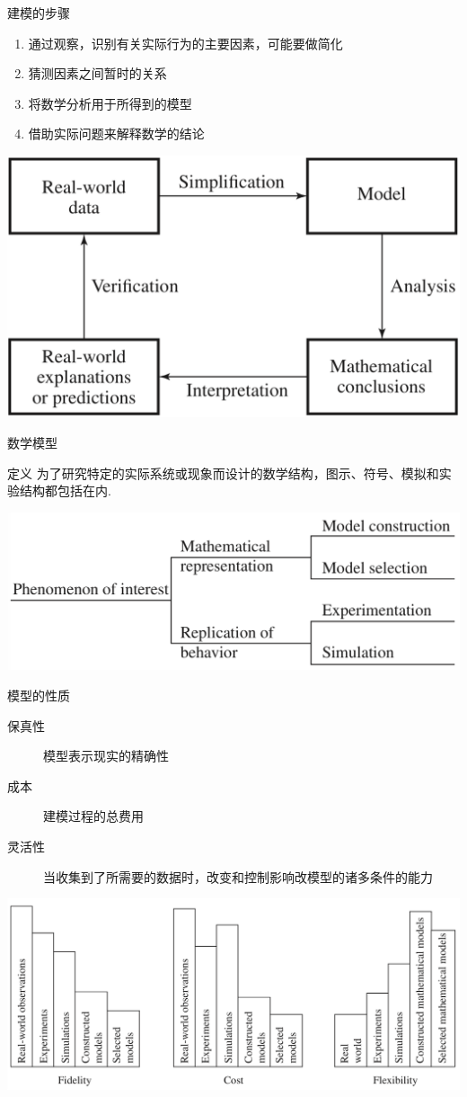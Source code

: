 \documentclass[UTF8]{ctexbeamer}
\begin{document}
\begin{frame}{建模的步骤}

  \begin{enumerate}
  \item 通过观察，识别有关实际行为的主要因素，可能要做简化
  \item 猜测因素之间暂时的关系
  \item 将数学分析用于所得到的模型
  \item 借助实际问题来解释数学的结论
  \end{enumerate}

  \begin{center}
    \includegraphics[width=.5\textwidth{}]{mmstep.png}
  \end{center}
\end{frame}

\begin{frame}{数学模型}

  \begin{block}{定义}
    为了研究特定的实际系统或现象而设计的数学结构，图示、符号、模拟和实验结构都包括在内.
  \end{block}

  \begin{center}
    \includegraphics[width=.6\textwidth{}]{modelprop.png}
  \end{center}
  
\end{frame}

\begin{frame}{模型的性质}
  \begin{description}
  \item[保真性] 模型表示现实的精确性
  \item[成本] 建模过程的总费用
  \item[灵活性] 当收集到了所需要的数据时，改变和控制影响改模型的诸多条件的能力
  \end{description}
  
  \begin{center}
    \includegraphics[width=.6\textwidth{}]{modelcompare.png}
  \end{center}
\end{frame}
\end{document}

